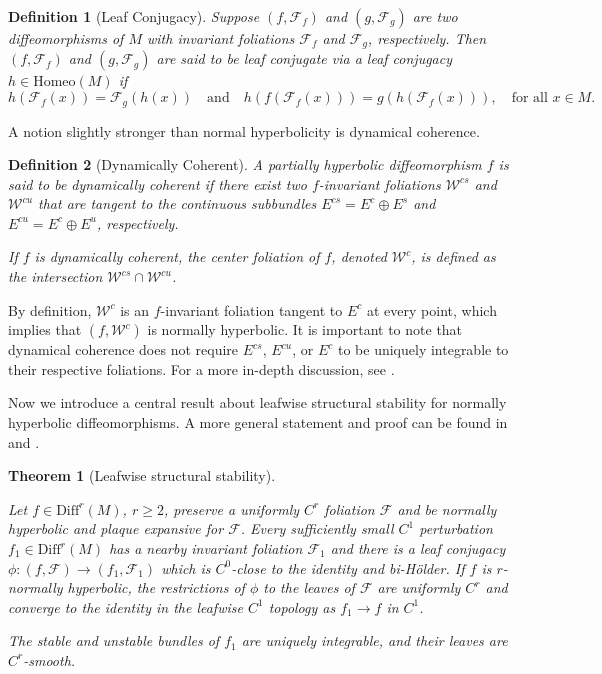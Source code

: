 \documentclass[11pt]{amsart}
\numberwithin{equation}{section}
\theoremstyle{plain}
\newtheorem{thm}{Theorem}[section]
\newtheorem{defi}{Definition}[section]
\begin{document}
\begin{defi}[Leaf Conjugacy]
Suppose $(f,\mathcal{F}_f)$ and $(g,\mathcal{F}_g)$ are two diffeomorphisms of $M$ with invariant foliations $\mathcal{F}_f$ and $\mathcal{F}_g$, respectively. Then $(f,\mathcal{F}_f)$ and $(g,\mathcal{F}_g)$ are said to be \emph{leaf conjugate} via a leaf conjugacy $h\in \mathrm{Homeo}(M)$ if
$$
h(\mathcal F_f(x))=\mathcal F_g(h(x))\quad \text{and}\quad h(f(\mathcal F_f(x)))=g(h(\mathcal F_f(x))), \quad \text{for all } x\in M.
$$
\end{defi}

A notion slightly stronger than normal hyperbolicity is dynamical coherence.

\begin{defi}[Dynamically Coherent]
A partially hyperbolic diffeomorphism $f$ is said to be \emph{dynamically coherent} if there exist two $f$-invariant foliations $\mathcal{W}^{cs}$ and $\mathcal{W}^{cu}$ that are tangent to the continuous subbundles $E^{cs}=E^c\oplus E^s$ and $E^{cu}=E^c\oplus E^u$, respectively.

If $f$ is dynamically coherent, the center foliation of $f$, denoted $\mathcal{W}^c$, is defined as the intersection $\mathcal{W}^{cs}\cap \mathcal{W}^{cu}$.
\end{defi}

By definition, $\mathcal{W}^c$ is an $f$-invariant foliation tangent to $E^c$ at every point, which implies that $(f,\mathcal{W}^c)$ is normally hyperbolic. It is important to note that dynamical coherence does not require $E^{cs}$, $E^{cu}$, or $E^c$ to be uniquely integrable to their respective foliations. For a more in-depth discussion, see \cite{BWcoh}.

Now we introduce a central result about leafwise structural stability for normally hyperbolic diffeomorphisms. A more general statement and proof can be found in \cite{BWcoh} and \cite{PSWholrev}.

\begin{thm}[Leafwise structural stability]\label{leafconj}

Let  $f\in\mathrm{Diff}^r(M)$, $r\ge2$, preserve a uniformly $C^r$
foliation $\mathcal F$ and be normally hyperbolic and plaque expansive for
$\mathcal F$.  Every sufficiently small $C^1$ perturbation $f_1\in\mathrm{Diff}^r(M)$ has a
nearby invariant foliation $\mathcal F_1$ and there is a leaf conjugacy
$\phi:(f,\mathcal F)\to(f_1,\mathcal F_1)$ which is $C^0$-close to the
identity and bi-H\"older.  If $f$ is $r$-normally hyperbolic, the restrictions of $\phi$ to the leaves of
$\mathcal F$ are uniformly $C^r$ and converge to the identity in the
leafwise $C^1$ topology as $f_1\to f$ in $C^1$.

The stable and unstable bundles of $f_1$ are uniquely integrable, and their
leaves are $C^r$-smooth.

\end{thm}
\end{document}
